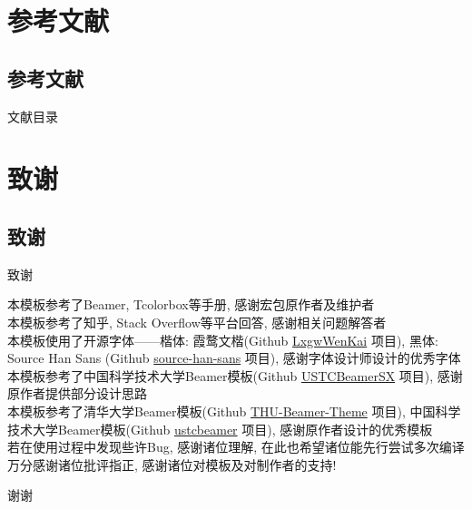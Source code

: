 \documentclass[hyperref, UTF8, CJK]{beamer}
\begin{document}
\section{参考文献}
\subsection{参考文献}
\begin{frame}[allowframebreaks]{文献目录}
	\nocite{*}
	\printbibliography[heading=none]
\end{frame}

\section{致谢}
\subsection{致谢}
\begin{frame}{致谢}
	\begin{center}
		本模板参考了Beamer, Tcolorbox等手册, 感谢宏包原作者及维护者\\[1ex]
		本模板参考了知乎, Stack Overflow等平台回答, 感谢相关问题解答者\\[1ex]
		本模板使用了开源字体——楷体: 霞鹜文楷(Github \href{https://github.com/lxgw/LxgwWenKai/}{\color{scublue}LxgwWenKai} 项目), 黑体: Source Han Sans (Github \href{https://github.com/adobe-fonts/source-han-sans/}{\color{scublue}source-han-sans} 项目), 感谢字体设计师设计的优秀字体\\[1ex]
		本模板参考了中国科学技术大学Beamer模板(Github \href{https://github.com/ysx2000/USTCBeamerSX/}{\color{scublue}USTCBeamerSX} 项目), 感谢原作者提供部分设计思路\\[1ex]
		本模板参考了清华大学Beamer模板(Github \href{https://github.com/tuna/THU-Beamer-Theme/}{\color{scublue}THU-Beamer-Theme} 项目), 中国科学技术大学Beamer模板(Github \href{https://github.com/ustctug/ustcbeamer/}{\color{scublue}ustcbeamer} 项目), 感谢原作者设计的优秀模板\\[1ex]
		
		若在使用过程中发现些许Bug, 感谢诸位理解, 在此也希望诸位能先行尝试多次编译\\[1ex]
		万分感谢诸位批评指正, 感谢诸位对模板及对制作者的支持!
	\end{center}
\end{frame}

\begin{frame}{}
	\centering
	\Huge 谢谢
\end{frame}
\end{document}
